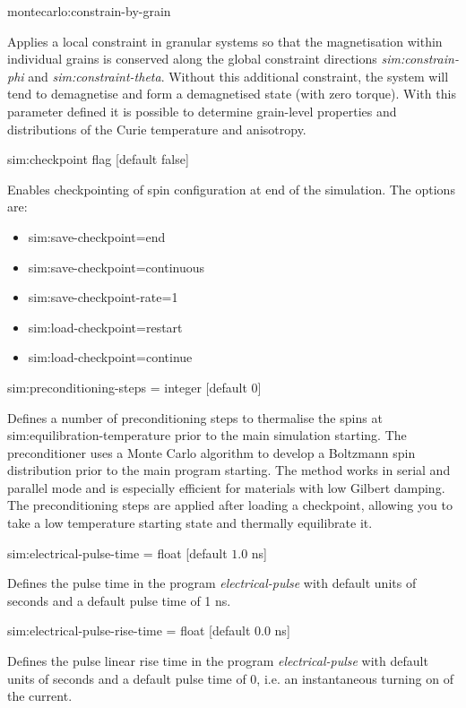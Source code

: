 {\zicf montecarlo:constrain-by-grain}
Applies a local constraint in granular systems so that the magnetisation within
individual grains is conserved along the global constraint directions
\textit{sim:constrain-phi} and \textit{sim:constraint-theta}. Without this
additional constraint, the system will tend to demagnetise and form a
demagnetised state (with zero torque). With this parameter defined it is
possible to determine grain-level properties and distributions of the Curie
temperature and anisotropy.

{\zicf sim:checkpoint flag [default false]} Enables checkpointing of spin configuration at end of the simulation. The options are:

\begin{itemize}
  \item[] sim:save-checkpoint=end
  \item[] sim:save-checkpoint=continuous
  \item[] sim:save-checkpoint-rate=1
  \item[] sim:load-checkpoint=restart
  \item[] sim:load-checkpoint=continue
\end{itemize}

{\zicf sim:preconditioning-steps = integer [default 0]} Defines a number of preconditioning steps to thermalise the spins at sim:equilibration-temperature prior to the main simulation starting. The preconditioner uses a Monte Carlo algorithm to develop a Boltzmann spin distribution prior to the main program starting. The method works in serial and parallel mode and is especially efficient for materials with low Gilbert damping. The preconditioning steps are applied after loading a checkpoint, allowing you to take a low temperature starting state and thermally equilibrate it.

{\zicf sim:electrical-pulse-time = float [default $1.0$ ns]}
Defines the pulse time in the program \textit{electrical-pulse} with default
units of seconds and a default pulse time of 1 ns.

{\zicf sim:electrical-pulse-rise-time = float [default $0.0$ ns]}
Defines the pulse linear rise time in the program \textit{electrical-pulse} with
 default units of seconds and a default pulse time of 0, i.e. an instantaneous
 turning on of the current.

